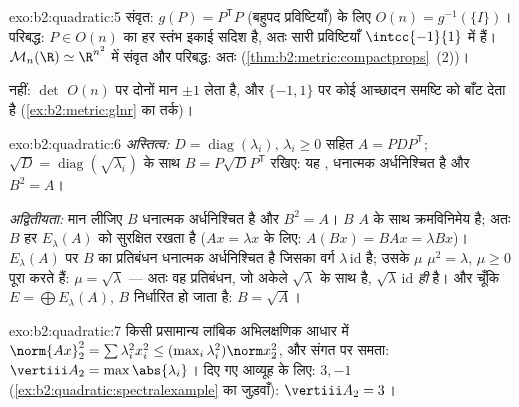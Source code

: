 \begin{solution}{exo:b2:quadratic:5}
संवृत:  $g(P) =
P^{\mathsf T}P$ (बहुपद प्रविष्टियाँ) के लिए $O(n) = g^{-1}(\{I\})$। परिबद्ध: $P
\in O(n)$ का हर स्तंभ
इकाई सदिश है, अतः सारी प्रविष्टियाँ $\intcc{-1}{1}$ में हैं। $\mathcal{M}_n(\R) \simeq \R^{n^2}$ में संवृत और परिबद्ध:
अतः  (\cref{thm:b2:metric:compactprops}~(2))।

 नहीं: $\det$ $O(n)$ पर दोनों मान $\pm1$ लेता है, और $\{-1, 1\}$ पर कोई  आच्छादन
समष्टि को बाँट देता है (\cref{ex:b2:metric:glnr} का तर्क)।
\end{solution}

\begin{solution}{exo:b2:quadratic:6}
\emph{अस्तित्व:} $D =
\operatorname{diag}(\lambda_i)$, $\lambda_i \geq 0$ सहित $A = PDP^{\mathsf T}$; $\sqrt D =
\operatorname{diag}(\sqrt{\lambda_i})$ के साथ $B =
P\sqrt D P^{\mathsf T}$ रखिए: यह ,
धनात्मक अर्धनिश्चित है और $B^2 = A$।

\emph{अद्वितीयता:} मान लीजिए $B$  धनात्मक अर्धनिश्चित है और $B^2 = A$। $B$
$A$ के साथ क्रमविनिमेय है; अतः $B$ हर  $E_\lambda(A)$ को सुरक्षित
रखता है ($Ax = \lambda x$ के लिए: $A(Bx) = BAx = \lambda Bx$)। $E_\lambda(A)$ पर $B$ का प्रतिबंधन  धनात्मक
अर्धनिश्चित है जिसका वर्ग $\lambda\,\mathrm{id}$ है; उसके  $\mu$ $\mu^2
= \lambda$, $\mu \geq 0$
पूरा करते हैं: $\mu = \sqrt\lambda$ --- अतः वह प्रतिबंधन, जो अकेले  $\sqrt\lambda$ के
साथ  है, $\sqrt\lambda\,\mathrm{id}$ \emph{ही} है। और चूँकि $E =
\bigoplus E_\lambda(A)$, $B$ निर्धारित हो
जाता है: $B = \sqrt A$।
\end{solution}

\begin{solution}{exo:b2:quadratic:7}
किसी प्रसामान्य लांबिक अभिलक्षणिक आधार में $\norm{Ax}_2^2 = \sum \lambda_i^2
x_i^2 \leq (\max_i \lambda_i^2)\norm x_2^2$, और संगत 
पर समता: $\vertiii A_2 = \max\abs{\lambda_i}$। दिए गए आव्यूह के लिए:  $3, -1$ (\cref{ex:b2:quadratic:spectralexample} का जुड़वाँ):
$\vertiii A_2 = 3$।
\end{solution}

